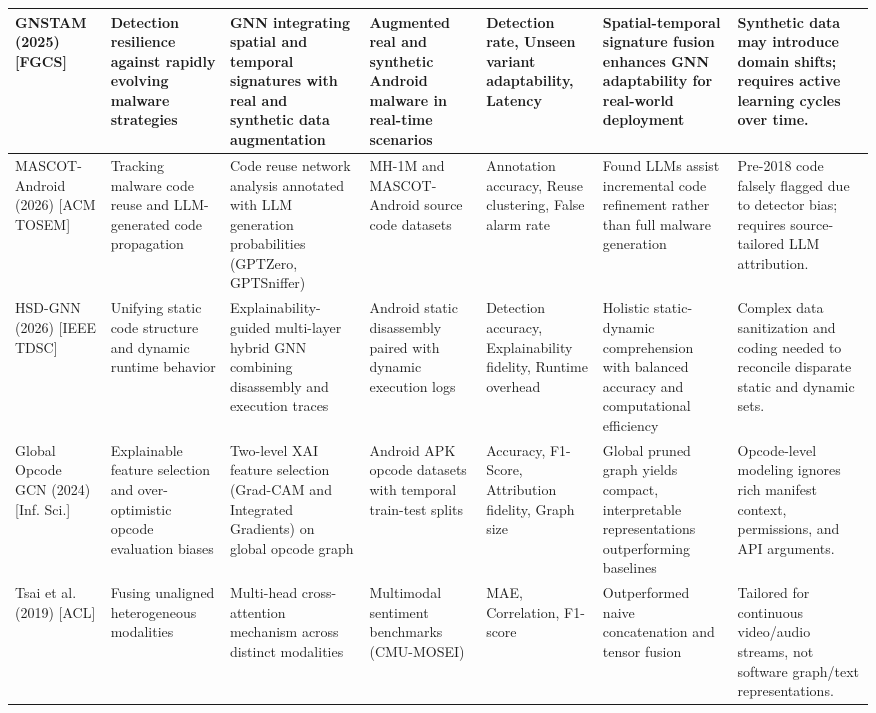 \documentclass[12pt,a4paper,oneside]{report}
\begin{document}
\begin{landscape}
\begin{longtable}{|p{2.1cm}|p{2.5cm}|p{3.3cm}|p{2.4cm}|p{2.6cm}|p{2.8cm}|p{3.3cm}|}
GNSTAM (2025) \cite{ref18} [FGCS] & Detection resilience against rapidly evolving malware strategies & GNN integrating spatial and temporal signatures with real and synthetic data augmentation & Augmented real and synthetic Android malware in real-time scenarios & Detection rate, Unseen variant adaptability, Latency & Spatial-temporal signature fusion enhances GNN adaptability for real-world deployment & Synthetic data may introduce domain shifts; requires active learning cycles over time.\\\hline

MASCOT-Android (2026) \cite{ref19} [ACM TOSEM] & Tracking malware code reuse and LLM-generated code propagation & Code reuse network analysis annotated with LLM generation probabilities (GPTZero, GPTSniffer) & MH-1M and MASCOT-Android source code datasets & Annotation accuracy, Reuse clustering, False alarm rate & Found LLMs assist incremental code refinement rather than full malware generation & Pre-2018 code falsely flagged due to detector bias; requires source-tailored LLM attribution.\\\hline

HSD-GNN (2026) \cite{ref20} [IEEE TDSC] & Unifying static code structure and dynamic runtime behavior & Explainability-guided multi-layer hybrid GNN combining disassembly and execution traces & Android static disassembly paired with dynamic execution logs & Detection accuracy, Explainability fidelity, Runtime overhead & Holistic static-dynamic comprehension with balanced accuracy and computational efficiency & Complex data sanitization and coding needed to reconcile disparate static and dynamic sets.\\\hline

Global Opcode GCN (2024) \cite{ref21} [Inf. Sci.] & Explainable feature selection and over-optimistic opcode evaluation biases & Two-level XAI feature selection (Grad-CAM and Integrated Gradients) on global opcode graph & Android APK opcode datasets with temporal train-test splits & Accuracy, F1-Score, Attribution fidelity, Graph size & Global pruned graph yields compact, interpretable representations outperforming baselines & Opcode-level modeling ignores rich manifest context, permissions, and API arguments.\\\hline

Tsai et al. (2019) \cite{ref7} [ACL] & Fusing unaligned heterogeneous modalities & Multi-head cross-attention mechanism across distinct modalities & Multimodal sentiment benchmarks (CMU-MOSEI) & MAE, Correlation, F1-score & Outperformed naive concatenation and tensor fusion & Tailored for continuous video/audio streams, not software graph/text representations.\\\hline


\end{longtable}
\end{landscape}
\end{document}
